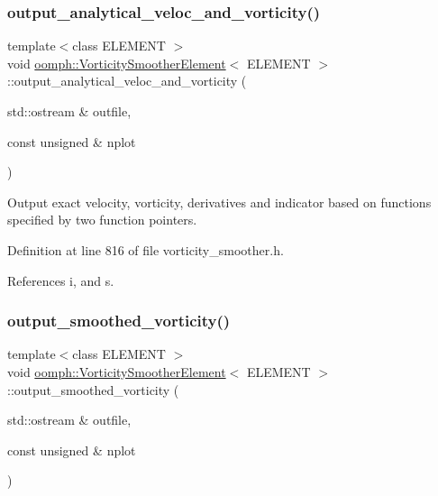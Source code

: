 \subsubsection{\texorpdfstring{output\+\_\+analytical\+\_\+veloc\+\_\+and\+\_\+vorticity()}{output\_analytical\_veloc\_and\_vorticity()}}
{\footnotesize\ttfamily template$<$class E\+L\+E\+M\+E\+NT $>$ \\
void \hyperlink{classoomph_1_1VorticitySmootherElement}{oomph\+::\+Vorticity\+Smoother\+Element}$<$ E\+L\+E\+M\+E\+NT $>$\+::output\+\_\+analytical\+\_\+veloc\+\_\+and\+\_\+vorticity (\begin{DoxyParamCaption}\item[{std\+::ostream \&}]{outfile,  }\item[{const unsigned \&}]{nplot }\end{DoxyParamCaption})\hspace{0.3cm}{\ttfamily [inline]}}



Output exact velocity, vorticity, derivatives and indicator based on functions specified by two function pointers. 



Definition at line 816 of file vorticity\+\_\+smoother.\+h.



References i, and s.

\mbox{\label{classoomph_1_1VorticitySmootherElement_aa2c5f7342ea784ae47a706524b63bafb}} 
\subsubsection{\texorpdfstring{output\+\_\+smoothed\+\_\+vorticity()}{output\_smoothed\_vorticity()}}
{\footnotesize\ttfamily template$<$class E\+L\+E\+M\+E\+NT $>$ \\
void \hyperlink{classoomph_1_1VorticitySmootherElement}{oomph\+::\+Vorticity\+Smoother\+Element}$<$ E\+L\+E\+M\+E\+NT $>$\+::output\+\_\+smoothed\+\_\+vorticity (\begin{DoxyParamCaption}\item[{std\+::ostream \&}]{outfile,  }\item[{const unsigned \&}]{nplot }\end{DoxyParamCaption})\hspace{0.3cm}{\ttfamily [inline]}}



